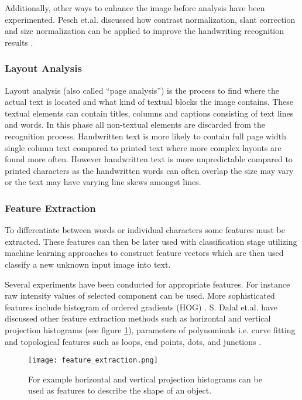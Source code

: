 \documentclass{article}
\begin{document}
        Additionally, other ways to enhance the image before analysis have been experimented. Pesch et.al. discussed how contrast normalization, slant correction and size normalization can be applied to improve the handwriting recognition results \cite{Pesch2012}.

      \subsubsection{Layout Analysis}
        Layout analysis (also called ``page analysis'') is the process to find where the actual text is located and what kind of textual blocks the image contains. These textual elements can contain titles, columns and captions consisting of text lines and words. In this phase all non-textual elements are discarded from the recognition process. Handwritten text is more likely to contain full page width single column text compared to printed text where more complex layouts are found more often. However handwritten text is more unpredictable compared to printed characters as the handwritten words can often overlap the size may vary or the text may have varying line skews amongst lines.

      \subsubsection{Feature Extraction}
        To differentiate between words or individual characters some features must be extracted. These features can then be later used with classification stage utilizing machine learning approaches to construct feature vectors which are then used classify a new unknown input image into text.

        Several experiments have been conducted for appropriate features. For instance raw intensity values of selected component can be used. More sophisticated features include histogram of ordered gradients (HOG) \cite{Dalal2005}. S. Dalal et.al. have discussed other feature extraction methods such as horizontal and vertical projection histograms (see figure \ref{fig:feature}), parameters of polynominals i.e. curve fitting and topological features such as loops, end points, dots, and junctions \cite{Dalal}.

        \begin{figure}[!ht]
          \centering
          \texttt{[image: feature\_extraction.png]}
          \caption{For example horizontal and vertical projection histograms can be used as features to describe the shape of an object.\label{fig:feature}}
        \end{figure}
\end{document}
